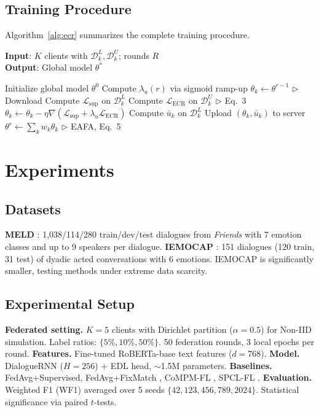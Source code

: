 \documentclass[letterpaper]{article}
\newcommand{\method}{FedSSL-MERC}
\begin{document}
\subsection{Training Procedure}
Algorithm~\ref{alg:ecr} summarizes the complete training procedure.

\begin{algorithm}[tb]
\caption{\method{}: Federated ECR Training}
\label{alg:ecr}
\textbf{Input}: $K$ clients with $\mathcal{D}_k^L, \mathcal{D}_k^U$; rounds $R$\\
\textbf{Output}: Global model $\theta^*$
\begin{algorithmic}[1]
\STATE Initialize global model $\theta^0$
\STATE Compute $\lambda_u(r)$ via sigmoid ramp-up
\STATE $\theta_k \leftarrow \theta^{r-1}$ \hfill $\triangleright$ Download
\STATE Compute $\mathcal{L}_{\text{sup}}$ on $\mathcal{D}_k^L$
\STATE Compute $\mathcal{L}_{\text{ECR}}$ on $\mathcal{D}_k^U$ \hfill $\triangleright$ Eq.~3
\STATE $\theta_k \leftarrow \theta_k - \eta \nabla(\mathcal{L}_{\text{sup}} + \lambda_u \mathcal{L}_{\text{ECR}})$
\ENDFOR
\STATE Compute $\bar{u}_k$ on $\mathcal{D}_k^L$
\STATE Upload $(\theta_k, \bar{u}_k)$ to server
\ENDFOR
\STATE $\theta^r \leftarrow \sum_k w_k \theta_k$ \hfill $\triangleright$ EAFA, Eq.~5
\ENDFOR
\end{algorithmic}
\end{algorithm}

\section{Experiments}

\subsection{Datasets}
\textbf{MELD} \cite{poria2019meld}: 1,038/114/280 train/dev/test dialogues from
\textit{Friends} with 7 emotion classes and up to 9 speakers per dialogue.
\textbf{IEMOCAP} \cite{busso2008iemocap}: 151 dialogues (120 train, 31 test) of
dyadic acted conversations with 6 emotions. IEMOCAP is significantly smaller,
testing methods under extreme data scarcity.

\subsection{Experimental Setup}
\textbf{Federated setting.} $K{=}5$ clients with Dirichlet partition
($\alpha{=}0.5$) for Non-IID simulation. Label ratios: $\{5\%, 10\%, 50\%\}$.
50 federation rounds, 3 local epochs per round.
\textbf{Features.} Fine-tuned RoBERTa-base text features ($d{=}768$).
\textbf{Model.} DialogueRNN ($H{=}256$) + EDL head, ${\sim}$1.5M parameters.
\textbf{Baselines.} FedAvg+Supervised, FedAvg+FixMatch \cite{sohn2020fixmatch},
CoMPM-FL \cite{lee2022compm}, SPCL-FL \cite{song2022spcl}.
\textbf{Evaluation.} Weighted F1 (WF1) averaged over 5 seeds
$\{42, 123, 456, 789, 2024\}$. Statistical significance via paired $t$-tests.
\end{document}
